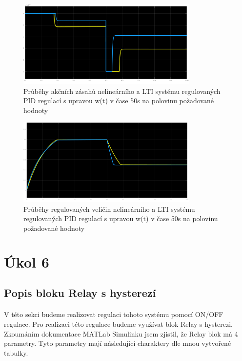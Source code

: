 \documentclass{article}
\begin{document}
	
		\begin{figure}[H]
		\centering
 	\includegraphics[width=0.8\textwidth]{ukol5uComp}
 	\caption{Průběhy akčních zásahů nelineárního a LTI systému regulovaných PID regulací s upravou w(t) v čase 50s na polovinu požadované hodnoty}
 	\label{img:akcnivel_realita}
 	\end{figure}
 	\begin{figure}[H]
 	\centering
 	\includegraphics[width=0.8\textwidth]{ukol5yComp}
 	\caption{Průběhy regulovaných veličin nelineárního a LTI systému regulovaných PID regulací s upravou w(t) v čase 50s na polovinu požadované hodnoty}
 	\end{figure}
 	
 	
	
	\section{Úkol 6}
	
	
	\subsection{Popis bloku Relay s hysterezí}
	\paragraph{}
	V této sekci budeme realizovat regulaci tohoto systému pomocí ON/OFF regulace. Pro realizaci této regulace budeme využívat	 blok Relay s hysterezi. Zkoumáním dokumentace MATLab Simulinku jsem zjistil, že Relay blok má 4 parametry. Tyto parametry mají následující charaktery dle mnou vytvořené tabulky.
	
\end{document}
